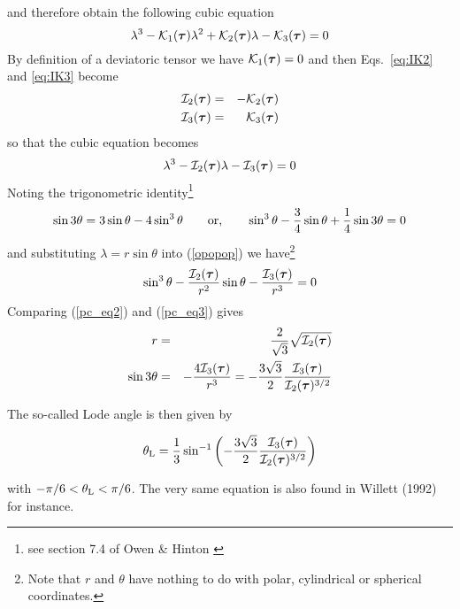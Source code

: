 and therefore obtain the following cubic equation
\begin{equation}
\lambda^3 - {\cal K}_1({\bm \tau}) \lambda^2 + {\cal K}_2({\bm \tau}) \lambda -{\cal K}_3({\bm \tau})=0
\end{equation}
By definition of a deviatoric tensor we have ${\cal K}_1({\bm \tau})=0$ and 
then Eqs.~\eqref{eq:IK2} and \eqref{eq:IK3} become
\begin{eqnarray}
{\cal I}_2({\bm \tau}) &=&  - {\cal K}_2({\bm \tau}) \\
{\cal I}_3({\bm \tau}) &=&  {\cal K}_3({\bm \tau}) 
\end{eqnarray}
so that the cubic equation becomes
\begin{equation} 
\lambda^3 -  {\cal I}_2({\bm \tau}) \lambda -  {\cal I}_3({\bm \tau}) =0 \label{opopop}
\end{equation}
Noting the trigonometric identity\footnote{see section 7.4 of Owen \& Hinton \cite{owhi}}
\begin{equation}
\sin 3\theta = 3 \sin \theta - 4 \sin^3 \theta
\qquad
{\rm or,}
\qquad
\sin^3 \theta - \frac{3}{4}\sin \theta + \frac{1}{4} \sin 3\theta = 0\label{pc_eq2}
\end{equation}
and substituting $\lambda=r\sin \theta$ into (\ref{opopop}) we have\footnote{Note that $r$ and $\theta$ have nothing 
to do with polar, cylindrical or spherical coordinates.}
\begin{equation}
\sin^3 \theta -\frac{ {\cal I}_2({\bm \tau})   }{r^2} \sin \theta -\frac{ {\cal I}_3({\bm \tau})  }{r^3}=0\label{pc_eq3}
\end{equation}
Comparing (\ref{pc_eq2}) and (\ref{pc_eq3}) gives
\begin{eqnarray}
r&=&\frac{2}{\sqrt{3}}\sqrt{ {\cal I}_2({\bm \tau})  }\label{pc_eq4bis} \\
\sin 3 \theta &=& -\frac{4 {\cal I}_3({\bm \tau})  }{r^3}=-\frac{3\sqrt{3}}{2}\frac{ {\cal I}_3({\bm \tau}) }{ {\cal I}_2({\bm \tau}) ^{3/2}} \label{pc_eq4}
\end{eqnarray}

The so-called Lode angle  \cite{zico74} is then given by 
\begin{mdframed}[backgroundcolor=blue!5]
\begin{equation}
\theta_{\rm L}=\frac{1}{3} \sin^{-1} 
\left( -\frac{3\sqrt{3}}{2} \frac{{\cal I}_3({\bm \tau})}{{\cal I}_2({\bm \tau})^{3/2}} \right)
\label{eq:lodang}
\end{equation}
\end{mdframed}
with $-\pi/6 <\theta_{\rm L} <\pi/6 $. The very same equation is 
also found in Willett (1992) \cite{will92} for instance.

